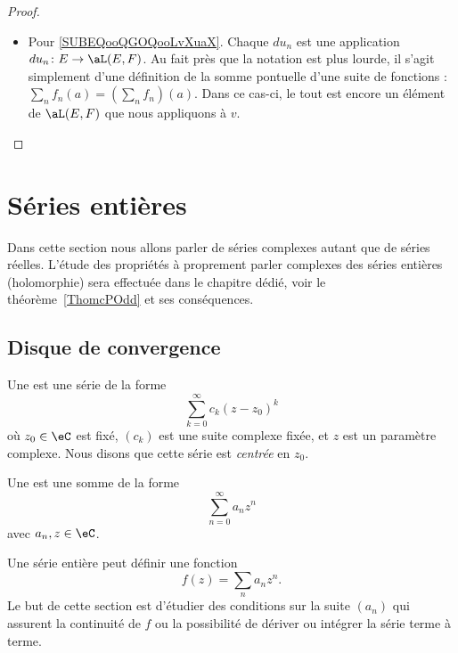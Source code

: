 \begin{proof}
\begin{subproof}
\begin{itemize}
                \item Pour \ref{SUBEQooQGOQooLvXuaX}. Chaque \( du_n\) est une application \( du_n\colon E\to \aL(E,F)\). Au fait près que la notation est plus lourde, il s'agit simplement d'une définition de la somme pontuelle d'une suite de fonctions : \( \sum_nf_n(a)=(\sum_nf_n)(a)\). Dans ce cas-ci, le tout est encore un élément de \( \aL(E,F)\) que nous appliquons à \( v\).
            \end{itemize}
    \end{subproof}
\end{proof}

\section{Séries entières}

Dans cette section nous allons parler de séries complexes autant que de séries réelles. L'étude des propriétés à proprement parler complexes des séries entières (holomorphie) sera effectuée dans le chapitre dédié, voir le théorème~\ref{ThomcPOdd} et ses conséquences.

\subsection{Disque de convergence}

Une  est une série de la forme
\begin{equation}		\label{eqseriepuissance}
	\sum_{k=0}^{\infty}c_k(z-z_0)^k
\end{equation}
où $z_0\in \eC$ est fixé, $(c_k)$ est une suite complexe fixée, et $z$ est un paramètre complexe. Nous disons que cette série est \emph{centrée} en $z_0$.

\begin{definition}
    Une  est une somme de la forme
    \begin{equation}
        \sum_{n=0}^{\infty}a_nz^n
    \end{equation}
    avec \( a_n,z\in\eC\).
\end{definition}
Une série entière peut définir une fonction
\begin{equation}
    f(z)=\sum_na_nz^n.
\end{equation}
Le but de cette section est d'étudier des conditions sur la suite \( (a_n)\) qui assurent la continuité de \( f\) ou la possibilité de dériver ou intégrer la série terme à terme.

